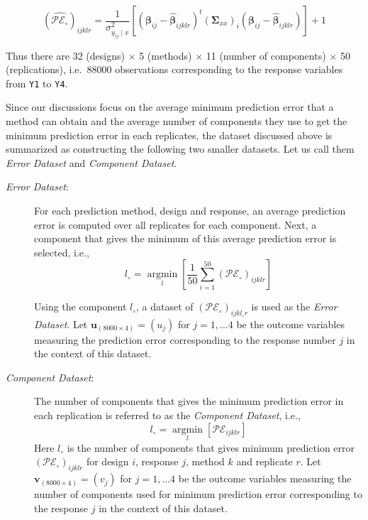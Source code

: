 \documentclass[review]{elsarticle}
\begin{document}
\begin{equation*}
\left(\widehat{\mathcal{PE_\circ}}\right)_{ijklr} =
  \frac{1}{\sigma_{y_{ij}\mid x}^2}\left[
    \left(\boldsymbol{\beta}_{ij} - \hat{\boldsymbol{\beta}}_{ijklr}\right)^t
    \left(\boldsymbol{\Sigma}_{xx}\right)_{i}
    \left(\boldsymbol{\beta}_{ij} - \hat{\boldsymbol{\beta}}_{ijklr}\right)
  \right] + 1
\end{equation*}

Thus there are 32 (designs) \(\times\) 5 (methods) \(\times\) 11 (number of components) \(\times\) 50 (replications), i.e.~88000 observations corresponding to the response variables from \texttt{Y1} to \texttt{Y4}.

Since our discussions focus on the average minimum prediction error that a method can obtain and the average number of components they use to get the minimum prediction error in each replicates, the dataset discussed above is summarized as constructing the following two smaller datasets. Let us call them \emph{Error Dataset} and \emph{Component Dataset}.

\begin{description}
\item[\emph{Error Dataset}:]
For each prediction method, design and response, an average prediction error is computed over all replicates for each component. Next, a component that gives the minimum of this average prediction error is selected, i.e.,
\begin{equation}
  l_\circ = \operatorname*{argmin}_{l}\left[\frac{1}{50}\sum_{i=1}^{50}{\left(\mathcal{PE}_\circ\right)_{ijklr}}\right]
  \label{eq:min-pred}
  \end{equation}

Using the component \(l_\circ\), a dataset of
\(\left(\mathcal{PE}_\circ\right)_{ijkl_\circ r}\) is used as the \emph{Error Dataset}.
Let \(\mathbf{u}_{(8000 \times 4)} = (u_j)\) for \(j = 1, \ldots 4\) be the outcome variables measuring the prediction error corresponding to the response number \(j\) in the context of this dataset.
\item[\emph{Component Dataset}:]
The number of components that gives the minimum prediction error in each replication is referred to as the \emph{Component Dataset}, i.e.,
\begin{equation}
  l_{\circ} = \operatorname*{argmin}_{l}\left[\mathcal{PE}_{ijklr}\right]
  \label{eq:min-comp}
  \end{equation}
Here \(l_\circ\) is the number of components that gives minimum prediction error \(\left(\mathcal{PE}_\circ\right)_{ijklr}\) for design \(i\), response \(j\), method \(k\) and replicate \(r\). Let \(\mathbf{v}_{(8000 \times 4)} = (v_j)\) for \(j = 1, \ldots 4\) be the outcome variables measuring the number of components used for minimum prediction error corresponding to the response \(j\) in the context of this dataset.
\end{description}
\end{document}
